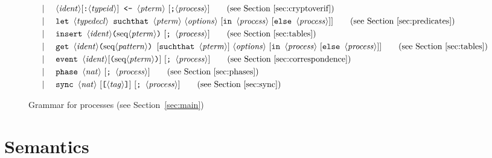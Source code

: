 \documentclass{book}
\newcommand{\nonterm}[1]{\langle\mathit{#1}\rangle}
\newcommand{\seq}[1]{\textrm{seq}\nonterm{#1}}
\begin{document}
\begin{figure}
\begin{align*}
&\mid\phantom{:=}
	\nonterm{ident}[\texttt{:}\nonterm{typeid}]\texttt{ <- }\nonterm{pterm} \ [\texttt{;} \nonterm{process}]\tag{see Section~\ref{sec:cryptoverif}}\\
&\mid\phantom{:=}
	\texttt{let } \nonterm{typedecl} \texttt{ suchthat } \nonterm{pterm}\ \nonterm{options}\ [\texttt{in } \nonterm{process}\textrm{ }[\texttt{else }\nonterm{process}]]\tag{see Section~\ref{sec:predicates}}\\
&\mid\phantom{:=}
	\texttt{insert }\nonterm{ident}\texttt{(}\seq{pterm}\texttt{)}\textrm{ }[\texttt{; }\nonterm{process}]\tag{see Section~\ref{sec:tables}}\\
&\mid\phantom{:=}
	\texttt{get }\nonterm{ident}\texttt{(}\seq{pattern}\texttt{) }[\texttt{suchthat }\nonterm{pterm}]\ \nonterm{options}\ [\texttt{in }\nonterm{process}\textrm{ }[\texttt{else }\nonterm{process}]]\tag{see Section~\ref{sec:tables}}\\
&\mid\phantom{:=}
	\texttt{event }\nonterm{ident}[\texttt{(}\seq{pterm}\texttt{)}]\ [\texttt{; }\nonterm{process}]\tag{see Section~\ref{sec:correspondence}}\\
&\mid\phantom{:=}
	\texttt{phase }\nonterm{nat}\textrm{ }[\texttt{; }\nonterm{process}]\tag{see Section~\ref{sec:phases}}\\
&\mid\phantom{:=}
	\texttt{sync }\nonterm{nat}\textrm{ }[\texttt{[}\nonterm{tag}\texttt{]}]\textrm{ }[\texttt{; }\nonterm{process}]\tag{see Section~\ref{sec:sync}}
\end{align*}
\caption[Grammar for processes]{Grammar for processes (see Section~\ref{sec:main})}
\label{fig:grammarProcess}
\end{figure}



\chapter{Semantics}


\newcommand{\pset}{{\cal P}}
\newcommand{\calT}{{\cal T}}
\newcommand{\calS}{{\cal S}}
\newcommand{\Npub}{{{\cal N}_{\mathrm{pub}}}}
\newcommand{\Npriv}{{\cal N}_{\mathrm{pr}}}
\newcommand{\env}{\Npriv}
\newcommand{\ph}{\mathit{ph}}

\newcommand{\teval}{\mathbin{\Downarrow}}
\newcommand{\defh}{\mathrm{def}(h)}
\newcommand{\defp}{\mathrm{def}(p)}
\end{document}
